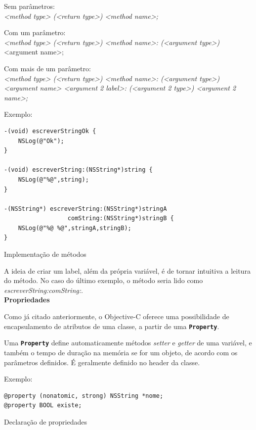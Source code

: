 \documentclass[a4paper,12pt,brazil,doubleside]{book}
\begin{document}
\begin{singlespace}
Sem parâmetros:\\
\emph{<method type> (<return type>) <method name>;}


Com um parâmetro:\\
\emph{<method type> (<return type>) <method name>: (<argument type>)} <argument name>;


Com mais de um parâmetro:\\
\emph{<method type> (<return type>) <method name>: (<argument type>) <argument name> <argument 2 label>: (<argument 2 type>) <argument 2 name>;}


Exemplo:

\begin{listing}
\begin{verbatim}
-(void) escreverStringOk {
	NSLog(@"Ok");
}

-(void) escreverString:(NSString*)string {
	NSLog(@"%@",string);
}

-(NSString*) escreverString:(NSString*)stringA
                  comString:(NSString*)stringB {
	NSLog(@"%@ %@",stringA,stringB);
}
\end{verbatim}
\caption{Implementação de métodos}
\end{listing}


A ideia de criar um label, além da própria variável, é de tornar intuitiva a leitura do método. No caso do último exemplo, o método seria lido como \emph{escreverString:comString:}.\\


\textbf{Propriedades}


Como já citado anteriormente, o Objective-C oferece uma possibilidade de encapsulamento de atributos de uma classe, a partir de uma \texttt{\textbf{Property}}.

Uma \texttt{\textbf{Property}} define automaticamente métodos \emph{setter} e \emph{getter} de uma variável, e também o tempo de duração na memória se for um objeto, de acordo com os parâmetros definidos. É geralmente definido no header da classe.

Exemplo:

\begin{listing}[H]
\begin{verbatim}
@property (nonatomic, strong) NSString *nome;
@property BOOL existe;
\end{verbatim}
\caption{Declaração de propriedades}
\end{listing}



\end{singlespace}
\end{document}
